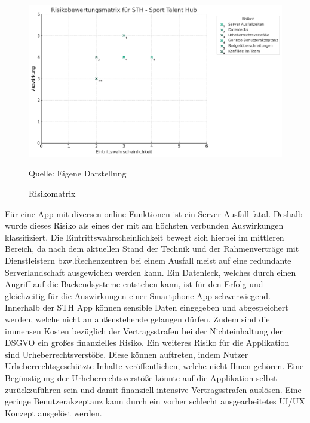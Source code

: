 \begin{figure}[H]
	\setcounter{figure}{0} 
	\caption[Risikomatrix]{Risikomatrix}
	\centering
	\includegraphics[width=1.0\textwidth]{assets/figures/risikomatrix.png}
	\begin{flushleft}
		Quelle: Eigene Darstellung
	\end{flushleft}
\end{figure}
\noindent
Für eine App mit diversen online Funktionen ist ein Server Ausfall fatal.
Deshalb wurde dieses Risiko als eines der mit am höchsten verbunden Auswirkungen klassifiziert.
Die Eintrittswahrscheinlichkeit bewegt sich hierbei im mittleren Bereich, da nach dem aktuellen Stand der Technik und der Rahmenverträge mit Dienstleistern bzw.\. Rechenzentren bei einem Ausfall meist auf eine redundante Serverlandschaft ausgewichen werden kann.\newline
Ein Datenleck, welches durch einen Angriff auf die Backendsysteme entstehen kann, ist für den Erfolg und gleichzeitig für die Auswirkungen einer Smartphone-App schwerwiegend.
Innerhalb der STH App können sensible Daten eingegeben und abgespeichert werden, welche nicht an außenstehende gelangen dürfen.
Zudem sind die immensen Kosten bezüglich der Vertragsstrafen bei der Nichteinhaltung der DSGVO ein großes finanzielles Risiko.\newline
Ein weiteres Risiko für die Applikation sind Urheberrechtsverstöße.
Diese können auftreten, indem Nutzer Urheberrechtsgeschützte Inhalte veröffentlichen, welche nicht Ihnen gehören.
Eine Begünstigung der Urheberrechtsverstöße könnte auf die Applikation selbst zurückzuführen sein und damit finanziell intensive Vertragsstrafen auslösen.\newline
Eine geringe Benutzerakzeptanz kann durch ein vorher schlecht ausgearbeitetes UI/UX Konzept ausgelöst werden.

